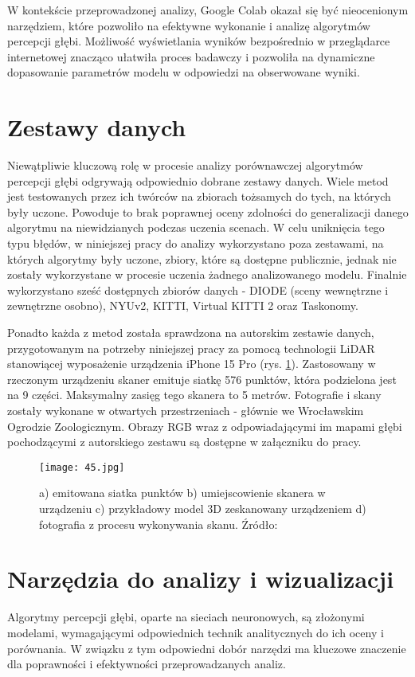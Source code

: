 W kontekście przeprowadzonej analizy, Google Colab okazał się być nieocenionym narzędziem, które pozwoliło na efektywne wykonanie i analizę algorytmów percepcji głębi. Możliwość wyświetlania wyników bezpośrednio w przeglądarce internetowej znacząco ułatwiła proces badawczy i pozwoliła na dynamiczne dopasowanie parametrów modelu w odpowiedzi na obserwowane wyniki.

\section{Zestawy danych}
Niewątpliwie kluczową rolę w procesie analizy porównawczej algorytmów percepcji głębi odgrywają odpowiednio dobrane zestawy danych. Wiele metod jest testowanych przez ich twórców na zbiorach tożsamych do tych, na których były uczone. Powoduje to brak poprawnej oceny zdolności do generalizacji danego algorytmu na niewidzianych podczas uczenia scenach. W celu uniknięcia tego typu błędów, w niniejszej pracy do analizy wykorzystano poza zestawami, na których algorytmy były uczone, zbiory, które są dostępne publicznie, jednak nie zostały wykorzystane w procesie uczenia żadnego analizowanego modelu. Finalnie wykorzystano sześć dostępnych zbiorów danych - DIODE (sceny wewnętrzne i zewnętrzne osobno), NYUv2, KITTI, Virtual KITTI 2 oraz Taskonomy.

Ponadto każda z metod została sprawdzona na autorskim zestawie danych, przygotowanym na potrzeby niniejszej pracy za pomocą technologii LiDAR stanowiącej wyposażenie urządzenia iPhone 15 Pro \cite{chase2022apple} (rys. \ref{fig:iphone-lidar}). Zastosowany w rzeczonym urządzeniu skaner emituje siatkę 576 punktów, która podzielona jest na 9 części. Maksymalny zasięg tego skanera to 5 metrów. Fotografie i skany zostały wykonane w otwartych przestrzeniach - głównie we Wrocławskim Ogrodzie Zoologicznym. Obrazy RGB wraz z odpowiadającymi im mapami głębi pochodzącymi z autorskiego zestawu są dostępne w załączniku do pracy.
\begin{figure}[H]
    \centering
    \texttt{[image: 45.jpg]}
    \caption{a) emitowana siatka punktów b) umiejscowienie skanera w urządzeniu c) przykładowy model 3D zeskanowany urządzeniem d) fotografia z procesu wykonywania skanu. Źródło: \cite{luetzenburg2021evaluation}}
    \label{fig:iphone-lidar}
\end{figure}

\section{Narzędzia do analizy i wizualizacji}
Algorytmy percepcji głębi, oparte na sieciach neuronowych, są złożonymi modelami, wymagającymi odpowiednich technik analitycznych do ich oceny i porównania. W związku z tym odpowiedni dobór narzędzi ma kluczowe znaczenie dla poprawności i efektywności przeprowadzanych analiz.

